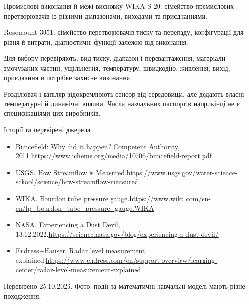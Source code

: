 \documentclass[aspectratio=169,11pt]{beamer}
\begin{document}
\begin{frame}{Промислові виконання й межі висновку}
WIKA S-20: сімейство промислових перетворювачів із різними діапазонами, виходами та приєднаннями.

Rosemount 3051: сімейство перетворювачів тиску та перепаду, конфігурації для рівня й витрати, діагностичні функції залежно від виконання.

Для вибору перевіряють: вид тиску, діапазон і перевантаження, матеріали змочуваних частин, ущільнення, температуру, швидкодію, живлення, вихід, приєднання й потрібне захисне виконання.

Розділювач і капіляр відокремлюють сенсор від середовища, але додають власні температурні й динамічні впливи. Числа навчальних паспортів наприкінці не є специфікаціями цих виробників.
\end{frame}
\begin{frame}{Історії та перевірені джерела}
\scriptsize
\begin{itemize}
\item Buncefield: Why did it happen? Competent Authority, 2011.\newline\url{https://www.icheme.org/media/10706/buncefield-report.pdf}
\item USGS. How Streamflow is Measured.\newline\url{https://www.usgs.gov/water-science-school/science/how-streamflow-measured}
\item WIKA. Bourdon tube pressure gauge.\newline\url{https://www.wika.com/en-en/lp_bourdon_tube_pressure_gauge.WIKA}
\item NASA. Experiencing a Dust Devil, 13.12.2022.\newline\url{https://science.nasa.gov/blog/experiencing-a-dust-devil/}
\item Endress+Hauser. Radar level measurement explained.\newline\url{https://www.endress.com/en/support-overview/learning-center/radar-level-measurement-explained}
\end{itemize}
Перевірено 25.10.2026. Фото, події та математичні навчальні моделі мають різне походження.
\end{frame}
\end{document}
